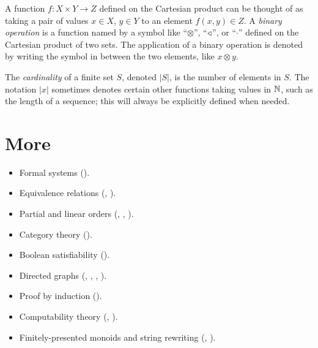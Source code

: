 \documentclass[../generics]{subfiles}
\begin{document}
A function $f\colon X\times Y\rightarrow Z$ defined on the Cartesian product can be thought of as taking a pair of values $x\in X$, $y\in Y$ to an element $f(x,y)\in Z$. A \emph{binary operation} is a function named by a symbol like ``\;$\otimes$\;'', ``\;$\triangleleft$\;'', or ``\;$\cdot$\;'' defined on the Cartesian product of two sets. The application of a binary operation is denoted by writing the symbol in between the two elements, like $x\otimes y$.

The \emph{cardinality} of a finite set $S$, denoted $|S|$, is the number of elements in $S$. The notation $|x|$ sometimes denotes certain other functions taking values in $\mathbb{N}$, such as the length of a sequence; this will always be explicitly defined when needed.

\section*{More}

\begin{itemize}
\item Formal systems ().
\item Equivalence relations (, ).
\item Partial and linear orders (, , ).
\item Category theory ().
\item Boolean satisfiability ().
\item Directed graphs (, , , ).
\item Proof by induction ().
\item Computability theory (, ).
\item Finitely-presented monoids and string rewriting (, ).
\end{itemize}
\end{document}
